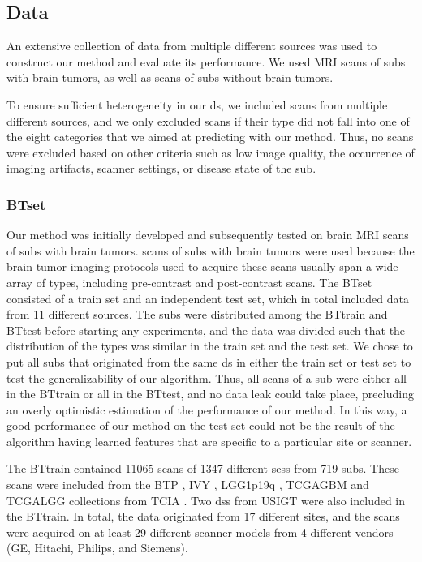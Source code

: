 \subsection{Data}

An extensive collection of data from multiple different sources was used to construct our method and evaluate its performance.
We used \gls{MRI} \glspl{scan} of \glspl{sub} with brain \glspl{tumor}, as well as \glspl{scan} of \glspl{sub} without brain \glspl{tumor}.

To ensure sufficient heterogeneity in our \gls{ds}, we included \glspl{scan} from multiple different sources, and we only excluded \glspl{scan} if their \gls{type} did not fall into one of the eight categories that we aimed at predicting with our method.
Thus, no \glspl{scan} were excluded based on other criteria such as low image quality, the occurrence of imaging artifacts, scanner settings, or disease state of the \gls{sub}.

\subsubsection{\Acrlong{BTset}}
Our method was initially developed and subsequently tested on brain \gls{MRI} \glspl{scan} of \glspl{sub} with brain \glspl{tumor}.
\Glspl{scan} of \glspl{sub} with brain \glspl{tumor} were used because the brain \gls{tumor} imaging protocols used to acquire these \glspl{scan} usually span a wide array of \glspl{type}, including pre-contrast and post-contrast \glspl{scan}.
The \gls{BTset} consisted of a train set and an independent test set, which in total included data from \num{11} different sources.
The \glspl{sub} were distributed among the \gls{BTtrain} and \gls{BTtest} before starting any experiments, and the data was divided such that the distribution of the \glspl{type} was similar in the train set and the test set.
We chose to put all \glspl{sub} that originated from the same \gls{ds} in either the train set or test set to test the generalizability of our algorithm.
Thus, all \glspl{scan} of a \gls{sub} were either all in the \gls{BTtrain} or all in the \gls{BTtest}, and no data leak could take place, precluding an overly optimistic estimation of the performance of our method.
In this way, a good performance of our method on the test set could not be the result of the algorithm having learned features that are specific to a particular \gls{site} or scanner.

The \gls{BTtrain} contained \num{11065} \glspl{scan} of \num{1347} different \glspl{ses} from \num{719} \glspl{sub}.
These \glspl{scan} were included from the \gls{BTP} \autocite{schmainda2018radiology}, \gls{IVY} \autocite{nameeta2016radiology}, \gls{LGG1p19q} \autocite{bradley2017radiology,akkus2017predicting}, \gls{TCGAGBM} \autocite{scarpace2016radiology} and \gls{TCGALGG} \autocite{pedano2016radiology} collections from \gls{TCIA} \autocite{clark2013cancer}.
Two \glspl{ds} from \gls{USIGT} \autocite{fyllingen2016glioblastoma,xiao2017retrospective} were also included in the \gls{BTtrain}.
In total, the data originated from \num{17} different \glspl{site}, and the \glspl{scan} were acquired on at least \num{29} different scanner models from \num{4} different vendors (GE, Hitachi, Philips, and Siemens).

